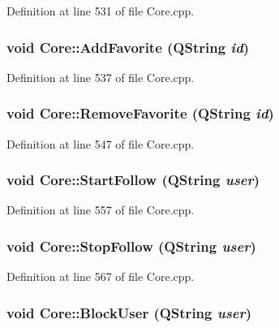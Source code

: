 Definition at line 531 of file Core.cpp.\hypertarget{classCore_dbeb18bcc46253950b7660582d2eb5f5}{
\subsubsection{\setlength{\rightskip}{0pt plus 5cm}void Core::AddFavorite (QString {\em id})}}
\label{classCore_dbeb18bcc46253950b7660582d2eb5f5}




Definition at line 537 of file Core.cpp.\hypertarget{classCore_c12e1d495cfea0a38c4adb38f258d27c}{
\subsubsection{\setlength{\rightskip}{0pt plus 5cm}void Core::RemoveFavorite (QString {\em id})}}
\label{classCore_c12e1d495cfea0a38c4adb38f258d27c}




Definition at line 547 of file Core.cpp.\hypertarget{classCore_5cd0ceaff4b8d19b40f9b2e00839a286}{
\subsubsection{\setlength{\rightskip}{0pt plus 5cm}void Core::StartFollow (QString {\em user})}}
\label{classCore_5cd0ceaff4b8d19b40f9b2e00839a286}




Definition at line 557 of file Core.cpp.\hypertarget{classCore_9a55db5cfe7788972b20d6a6bdc91218}{
\subsubsection{\setlength{\rightskip}{0pt plus 5cm}void Core::StopFollow (QString {\em user})}}
\label{classCore_9a55db5cfe7788972b20d6a6bdc91218}




Definition at line 567 of file Core.cpp.\hypertarget{classCore_e715888efd76cc27271e4050ebed4c0b}{
\subsubsection{\setlength{\rightskip}{0pt plus 5cm}void Core::BlockUser (QString {\em user})}}
\label{classCore_e715888efd76cc27271e4050ebed4c0b}





